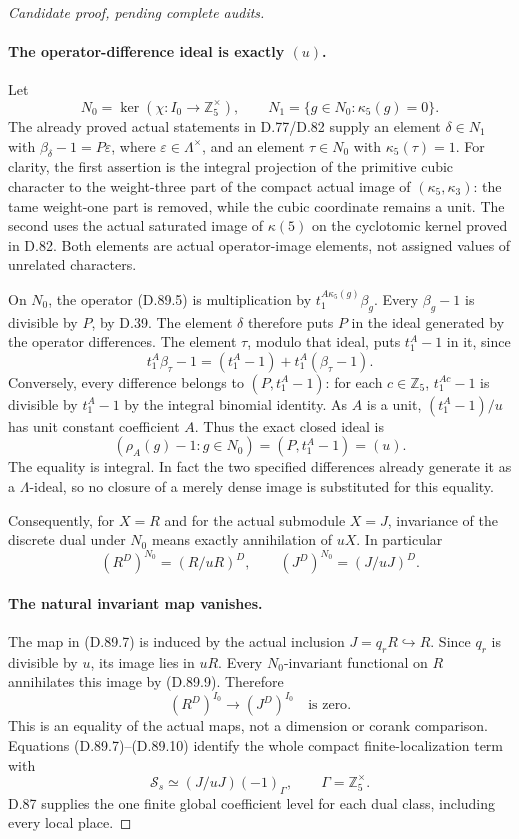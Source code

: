 \begin{proof}[Candidate proof, pending complete audits]
\paragraph{The operator-difference ideal is exactly \((u)\).}
Let
\[
 N_0=\ker(\chi:I_0\to\mathbb Z_5^\times),\qquad
 N_1=\{g\in N_0:\kappa_5(g)=0\}.
\]
The already proved actual statements in D.77/D.82 supply
an element \(\delta\in N_1\) with
\(\beta_\delta-1=P\varepsilon\), where
\(\varepsilon\in\Lambda^\times\), and an element
\(\tau\in N_0\) with \(\kappa_5(\tau)=1\).
For clarity, the first assertion is the integral projection
of the primitive cubic character to the weight-three part of
the compact actual image of \((\kappa_5,\kappa_3)\):
the tame weight-one part is removed, while the cubic coordinate
remains a unit. The second uses the actual saturated image of
\(\kappa(5)\) on the cyclotomic kernel proved in D.82.
Both elements are actual operator-image elements, not assigned
values of unrelated characters.

On \(N_0\), the operator (D.89.5) is multiplication by
\(t_1^{A\kappa_5(g)}\beta_g\). Every \(\beta_g-1\)
is divisible by \(P\), by D.39. The element \(\delta\)
therefore puts \(P\) in the ideal generated by the operator
differences. The element \(\tau\), modulo that ideal,
puts \(t_1^A-1\) in it, since
\[
 t_1^A\beta_\tau-1=(t_1^A-1)+t_1^A(\beta_\tau-1).
\]
Conversely, every difference belongs to
\((P,t_1^A-1)\): for each \(c\in\mathbb Z_5\),
\(t_1^{Ac}-1\) is divisible by \(t_1^A-1\) by the
integral binomial identity. As \(A\) is a unit,
\((t_1^A-1)/u\) has unit constant coefficient \(A\).
Thus the exact closed ideal is
\[
       (\rho_A(g)-1:g\in N_0)=(P,t_1^A-1)=(u).         \tag{D.89.8}
\]
The equality is integral. In fact the two specified differences
already generate it as a \(\Lambda\)-ideal, so no closure
of a merely dense image is substituted for this equality.

Consequently, for \(X=R\) and for the actual submodule
\(X=J\), invariance of the discrete dual under \(N_0\)
means exactly annihilation of \(uX\). In particular
\[
                (R^D)^{N_0}=(R/uR)^D,
                \qquad (J^D)^{N_0}=(J/uJ)^D.            \tag{D.89.9}
\]

\paragraph{The natural invariant map vanishes.}
The map in (D.89.7) is induced by the actual inclusion
\(J=q_rR\hookrightarrow R\). Since \(q_r\) is
divisible by \(u\), its image lies in \(uR\).
Every \(N_0\)-invariant functional on \(R\) annihilates
this image by (D.89.9). Therefore
\[
                 (R^D)^{I_0}\longrightarrow(J^D)^{I_0}
                           \quad\text{is zero}.        \tag{D.89.10}
\]
This is an equality of the actual maps, not a dimension or
corank comparison. Equations (D.89.7)--(D.89.10) identify
the whole compact finite-localization term with
\[
                   \mathcal S_s\simeq(J/uJ)(-1)_\Gamma,
                   \qquad\Gamma=\mathbb Z_5^\times.    \tag{D.89.11}
\]
D.87 supplies the one finite global coefficient level for
each dual class, including every local place.


\end{proof}
